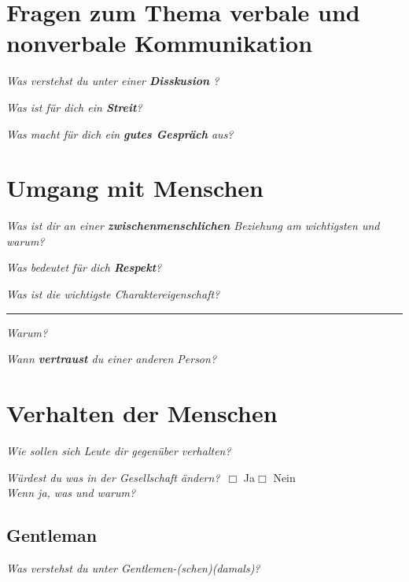 \documentclass[a4paper,12pt]{scrartcl}
\newcommand{\checkbox}{\(\Box\)}
\newcommand{\hfilloutline}[1]{\rule{#1}{0.5pt}}
\newcommand{\frage}[1]{\textit{#1}}
\renewcommand{\emph}[1]{\textbf{#1}}
\begin{document}
\section*{Fragen zum Thema verbale und nonverbale Kommunikation}

\frage{Was verstehst du unter einer \emph{Disskusion} ?}
\vspace{3cm}

\frage{Was ist für dich ein \emph{Streit}?}
\vspace{3cm}

\frage{Was macht für dich ein \emph{gutes Gespräch} aus?}
\vspace{4cm}


\newpage

   



\section*{Umgang mit Menschen}

\frage{Was ist dir an einer \emph{zwischenmenschlichen} Beziehung am wichtigsten und warum?}
\vspace{4cm}


\frage{Was bedeutet für dich \emph{Respekt}?}
\vspace{3cm}


\frage{Was ist die wichtigste Charaktereigenschaft?} \hfill\hfilloutline{7.5cm}
\frage{Warum?}
\vspace{2cm}



\frage{Wann \emph{vertraust} du einer anderen Person?}
\newpage




\section*{Verhalten der Menschen}

\frage{Wie sollen sich Leute dir gegenüber verhalten?}
\vspace{2cm}


\frage{Würdest du was in der Gesellschaft ändern?}\ \checkbox{} Ja\hspace{0.8cm}\checkbox{} Nein\\
\frage{Wenn ja, was und warum?}
\vspace{3cm}

\subsection*{Gentleman}
\frage{Was verstehst du unter Gentlemen-(schen)(damals)?}
\vspace{2cm} 
\end{document}
